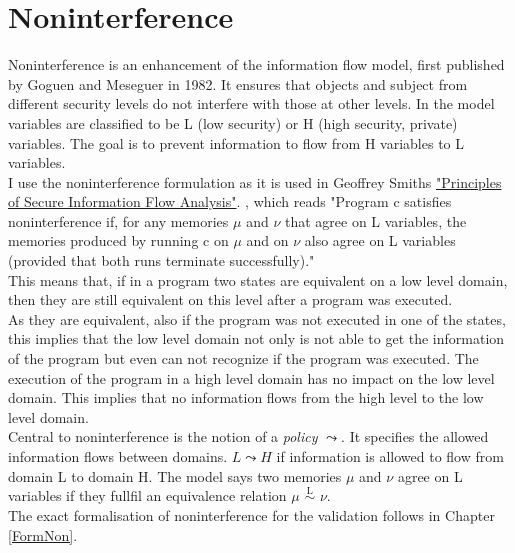 \section{Noninterference}
Noninterference is an enhancement of the information flow model, first published by Goguen and Meseguer in 1982. It ensures that objects and subject from different security levels do not interfere with those at other levels. In the model variables are classified to be L (low security) or H (high security, private) variables. The goal is to prevent information to flow from H variables to L variables. \\
I use the noninterference formulation as it is used in Geoffrey Smiths \href{http://users.cis.fiu.edu/~smithg/papers/sif06.pdf}{%
		"Principles of Secure Information Flow Analysis"}. \cite{InfFlow}, which reads "Program c satisfies noninterference if, for any memories $\mu$ and $\nu$ that agree on L variables, the memories produced by running c on $\mu$ and on $\nu$ also agree on L variables (provided that both runs terminate successfully)." \\
This means that, if in a program two states are equivalent on a low level domain, then they are still equivalent on this level after a program was executed.\\ As they are equivalent, also if the program was not executed in one of the states, this implies that the low level domain not only is not able to get the information of the program but even can not recognize if the program was executed. The execution of the program in a high level domain has no impact on the low level domain. This implies that no information flows from the high level to the low level domain. \\
Central to noninterference is the notion of a \textit{policy} $\leadsto$. It specifies the allowed information flows between domains. $L \leadsto H$ if information is allowed to flow from domain L to domain H. The model says two memories $\mu$ and $\nu$ agree on L variables if they fullfil an equivalence relation $\mu$ $\overset{\text{L}}{\sim}$ $\nu$. \\
The exact formalisation of noninterference for the validation follows in Chapter \ref{FormNon}.